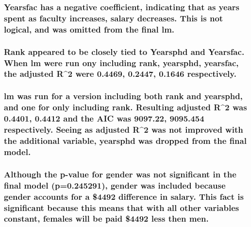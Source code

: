 \documentclass[]{article}
\begin{document}
\subsubsection{Yearsfac has a negative coefficient, indicating that as
years spent as faculty increases, salary decreases. This is not logical,
and was omitted from the final
lm.}\label{yearsfac-has-a-negative-coefficient-indicating-that-as-years-spent-as-faculty-increases-salary-decreases.-this-is-not-logical-and-was-omitted-from-the-final-lm.}

\subsubsection{Rank appeared to be closely tied to Yearsphd and
Yearsfac. When lm were run ony including rank, yearsphd, yearsfac, the
adjusted R\^{}2 were 0.4469, 0.2447, 0.1646
respectively.}\label{rank-appeared-to-be-closely-tied-to-yearsphd-and-yearsfac.-when-lm-were-run-ony-including-rank-yearsphd-yearsfac-the-adjusted-r2-were-0.4469-0.2447-0.1646-respectively.}

\subsubsection{lm was run for a version including both rank and
yearsphd, and one for only including rank. Resulting adjusted R\^{}2 was
0.4401, 0.4412 and the AIC was 9097.22, 9095.454 respectively. Seeing as
adjusted R\^{}2 was not improved with the additional variable, yearsphd
was dropped from the final
model.}\label{lm-was-run-for-a-version-including-both-rank-and-yearsphd-and-one-for-only-including-rank.-resulting-adjusted-r2-was-0.4401-0.4412-and-the-aic-was-9097.22-9095.454-respectively.-seeing-as-adjusted-r2-was-not-improved-with-the-additional-variable-yearsphd-was-dropped-from-the-final-model.}

\subsubsection{Although the p-value for gender was not significant in
the final model (p=0.245291), gender was included because gender
accounts for a \$4492 difference in salary. This fact is significant
because this means that with all other variables constant, females will
be paid \$4492 less then
men.}\label{although-the-p-value-for-gender-was-not-significant-in-the-final-model-p0.245291-gender-was-included-because-gender-accounts-for-a-4492-difference-in-salary.-this-fact-is-significant-because-this-means-that-with-all-other-variables-constant-females-will-be-paid-4492-less-then-men.}
\end{document}
